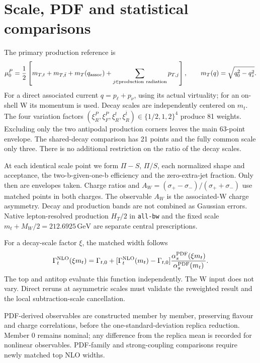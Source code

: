 \documentclass[11pt,a4paper]{article}
\newcommand{\as}{\alpha_s}
\newcommand{\GeV}{\,\mathrm{GeV}}
\begin{document}
\section{Scale, PDF and statistical comparisons}

The primary production reference is
\begin{equation}
\mu^P_0=\frac12\left[m_{T,t}+m_{T,\bar t}+m_T(q_{\rm assoc})
+\sum_{j\in{\rm production\ radiation}}p_{T,j}\right],\qquad
m_T(q)=\sqrt{q_0^2-q_z^2}.
\end{equation}
For a direct associated current $q=p_\ell+p_\nu$, using its actual
virtuality; for an on-shell W its momentum is used. Decay scales are
independently centered on $m_t$. The four variation factors
$(\xi_R^P,\xi_F^P,\xi_R^t,\xi_R^{\bar t})\in\{1/2,1,2\}^4$
produce 81 weights. Excluding only the two antipodal production corners
leaves the main 63-point envelope. The shared-decay comparison has 21
points and the fully common scale only three. There is no additional
restriction on the ratio of the decay scales.

At each identical scale point we form $\Pi-S$, $\Pi/S$, each normalized
shape and acceptance, the two-b-given-one-b efficiency and the zero-extra-jet
fraction. Only then are envelopes taken. Charge ratios and
$A_W=(\sigma_+-\sigma_-)/(\sigma_++\sigma_-)$ use matched points in both
charges. The observable $A_W$ is the associated-W charge asymmetry.
Decay and production bands are not combined as Gaussian errors.
Native lepton-resolved production $H_T/2$ in \texttt{all-bw} and the
fixed scale $m_t+M_W/2=212.6925\GeV$ are separate central prescriptions.

For a decay-scale factor $\xi$, the matched width follows
\begin{equation}
\Gamma_t^{\rm NLO}(\xi m_t)=\Gamma_{t,0}+
[\Gamma_t^{\rm NLO}(m_t)-\Gamma_{t,0}]
\frac{\as^{\rm PDF}(\xi m_t)}{\as^{\rm PDF}(m_t)}.
\end{equation}
The top and antitop evaluate this function independently. The W input
does not vary. Direct reruns at asymmetric scales must validate the
reweighted result and the local subtraction-scale cancellation.

PDF-derived observables are constructed member by member, preserving
flavour and charge correlations, before the one-standard-deviation
replica reduction. Member 0 remains nominal; any difference from the
replica mean is recorded for nonlinear observables. PDF-family and
strong-coupling comparisons require newly matched top NLO widths.
\end{document}
